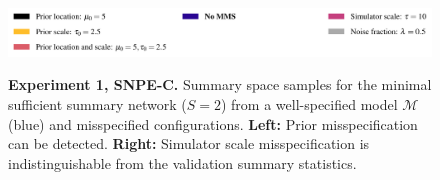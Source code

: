 \documentclass[twoside,11pt]{article}
\newcommand{\numberGaussianMeans}{1}
\newcommand{\0}{\boldsymbol{0}}
\newcommand{\M}{\mathcal{M}}
\begin{document}
\begin{figure}[t]
\begin{subfigure}[t]{0.45\linewidth}
    \end{subfigure}\\
    \includegraphics[width=0.95\linewidth]{plots/abf_mvn_means_sufficient_pairplot_MMD_legend_new.pdf}
    \caption{\textbf{Experiment \numberGaussianMeans, SNPE-C.} Summary space samples for the minimal sufficient summary network ($S=2$) from a well-specified model $\M$ (blue) and misspecified configurations. \textbf{Left:} Prior misspecification can be detected. \textbf{Right:} Simulator scale misspecification is indistinguishable from the validation summary statistics.}
\end{figure}
\end{document}
